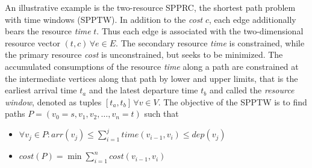 \begin{definition}[SPPTW]
An illustrative example is the two-resource SPPRC, the shortest path problem with time windows (SPPTW). In addition to the \textit{cost} $c$, each edge additionally bears the resource \textit{time} $t$. Thus each edge is associated with the two-dimensional resource vector $(t,c) \, \forall e \in E$. The secondary resource \textit{time} is constrained, while the primary resource \textit{cost} is unconstrained, but seeks to be minimized. The accumulated consumptions of the resource \textit{time} along a path are constrained at the intermediate vertices along that path by lower and upper limits, that is the earliest arrival time $t_a$ and the latest departure time $t_b$ and called the \textit{resource window}, denoted as tuples $[t_a,t_b] \, \forall v \in V$. The objective of the SPPTW is to find paths $P=(v_0=s,v_1,v_2,\dots,v_n=t)$ such that 
\begin{itemize}
	\item $\forall v_j \in P: arr(v_j) \leq \sum_{i=1}^{j}{time(v_{i-1},v_{i})} \leq dep(v_j)$
	\item $cost(P) = \min{\sum_{i=1}^{n}cost(v_{i-1},v_i)}$
\end{itemize}
\end{definition}



